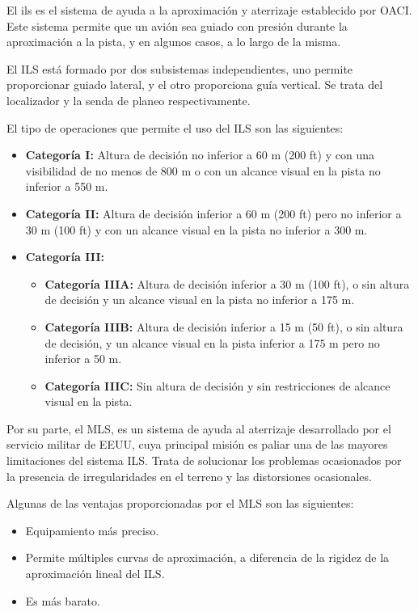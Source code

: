 El \acrfull{ils} es el sistema de ayuda a la aproximación y aterrizaje establecido por OACI. Este sistema permite que un avión sea guiado con presión durante la aproximación a la pista, y en algunos casos, a lo largo de la misma.

El ILS está formado por dos subsistemas independientes, uno permite proporcionar guiado lateral, y el otro proporciona guía vertical. Se trata del localizador y la senda de planeo respectivamente.

El tipo de operaciones que permite el uso del ILS son las siguientes:

\begin{itemize}
    \item \textbf{Categoría I:} Altura de decisión no inferior a 60 m (200 ft) y con una visibilidad de no menos de 800 m o con un alcance visual en la pista no inferior a 550 m.
    \item \textbf{Categoría II:} Altura de decisión inferior a 60 m (200 ft) pero no inferior a 30 m (100 ft) y con un alcance visual en la pista no inferior a 300 m.
    \item \textbf{Categoría III:}
    \begin{itemize}
        \item \textbf{Categoría IIIA:} Altura de decisión inferior a 30 m (100 ft), o sin altura de decisión y un alcance visual en la pista no inferior a 175 m.
        \item \textbf{Categoría IIIB:} Altura de decisión inferior a 15 m (50 ft), o sin altura de decisión, y un alcance visual en la pista inferior a 175 m pero no inferior a 50 m.
        \item \textbf{Categoría IIIC:} Sin altura de decisión y sin restricciones de alcance visual en la pista.
    \end{itemize}
\end{itemize}

Por su parte, el MLS, es un sistema de ayuda al aterrizaje desarrollado por el servicio militar de EEUU, cuya principal misión es paliar una de las mayores limitaciones del sistema ILS. Trata de solucionar los problemas ocasionados por la presencia de irregularidades en el terreno y las distorsiones ocasionales.

Algunas de las ventajas proporcionadas por el MLS son las siguientes:

\begin{itemize}
    \item Equipamiento más preciso.
    \item Permite múltiples curvas de aproximación, a diferencia de la rigidez de la aproximación lineal del ILS.
    \item Es más barato.
\end{itemize}

